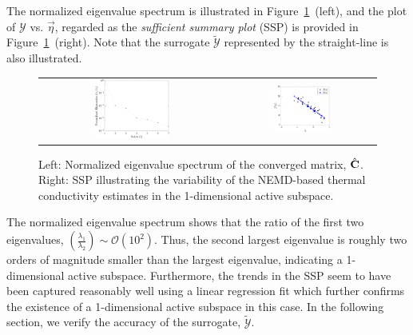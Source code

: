 The normalized eigenvalue spectrum is illustrated
in Figure~\ref{fig:casfig2}~(left), and the plot of $\mathcal{Y}$ vs. $\vec\eta$, regarded as the \textit{sufficient
summary plot} (SSP) is provided in Figure~\ref{fig:casfig2}~(right). Note that the surrogate $\tilde{\mathcal{Y}}$
represented by the straight-line is also illustrated.
%
\begin{figure}[htbp]
\begin{center}
\begin{tabular}{cc}
  \includegraphics[width=0.42\textwidth]{./Figures/eig_spec}
  &
  \hspace{3mm}
  \includegraphics[width=0.4\textwidth]{./Figures/free_ssp1D}
  \end{tabular}
\caption{Left: Normalized eigenvalue spectrum of the converged matrix, $\hat{\mathbf{{C}}}$. Right: SSP
illustrating the variability of the NEMD-based thermal conductivity estimates in the 1-dimensional
active subspace.}
\label{fig:casfig2}
\end{center}
\end{figure}
%
The normalized eigenvalue spectrum
shows that the ratio of the first two eigenvalues, $\left(\frac{\lambda_1}{\lambda_2}\right)\sim\mathcal{O}(10^2)$.
Thus, the second largest eigenvalue is roughly two orders of magnitude smaller than the largest eigenvalue,
indicating a 1-dimensional active subspace. Furthermore, the trends in the SSP seem to have been captured
reasonably well using a linear regression fit which further confirms the existence of a 1-dimensional active
subspace in this case. In the following section, we verify the accuracy of the
surrogate, $\tilde{\mathcal{Y}}$. 


